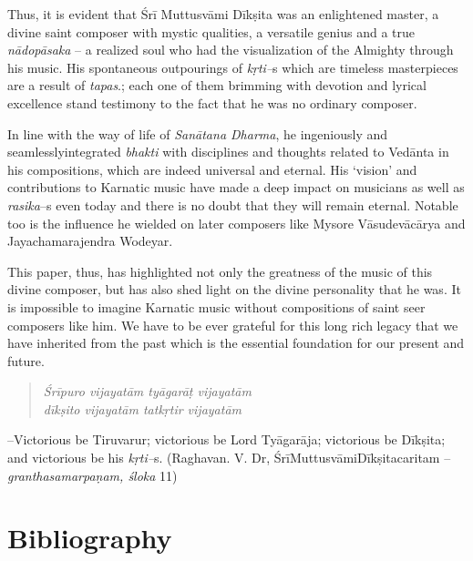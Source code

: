 Thus, it is evident that Śrī Muttusvāmi Dīkṣita was an enlightened master, a divine saint composer with mystic qualities, a versatile genius and a true \textit{nādopāsaka} – a realized soul who had the visualization of the Almighty through his music. His spontaneous outpourings of \textit{kṛti–}s which are timeless masterpieces are a result of \textit{tapas}.; each one of them brimming with devotion and lyrical excellence stand testimony to the fact that he was no ordinary composer.

In line with the way of life of \textit{Sanātana Dharma}, he ingeniously and seamlesslyintegrated \textit{bhakti} with disciplines and thoughts related to Vedānta in his compositions, which are indeed universal and eternal. His ‘vision’ and contributions to Karnatic music have made a deep impact on musicians as well as \textit{rasika}–s even today and there is no doubt that they will remain eternal. Notable too is the influence he wielded on later composers like Mysore Vāsudevācārya and Jayachamarajendra Wodeyar.

This paper, thus, has highlighted not only the greatness of the music of this divine composer, but has also shed light on the divine personality that he was. It is impossible to imagine Karnatic music without compositions of saint seer composers like him. We have to be ever grateful for this long rich legacy that we have inherited from the past which is the essential foundation for our present and future.

\vspace{-.3cm}

\begin{verse}
\textit{Śrīpuro vijayatām tyāgarāṭ vijayatām} \\\textit{dīkṣito vijayatām tatkṛtir vijayatām} 
\end{verse}

\vspace{-.3cm}

–Victorious be Tiruvarur; victorious be Lord Tyāgarāja; victorious be Dīkṣita; and victorious be his \textit{kṛti–}s. (Raghavan. V. Dr, ŚrīMuttusvāmiDīkṣitacaritam – \textit{granthasamarpaṇam, śloka} 11)

\vspace{-.3cm}

\section*{Bibliography}

